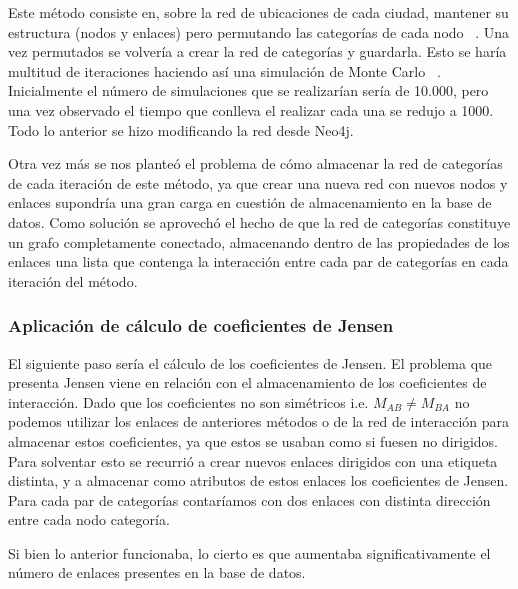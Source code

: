 Este método consiste en, sobre la red de ubicaciones de cada ciudad, mantener su estructura (nodos y enlaces) pero permutando las categorías de cada nodo ~\cite{Ahedo2021,RSVAJSSHJG}. Una vez permutados se volvería a crear la red de categorías y guardarla. Esto se haría multitud de iteraciones haciendo así una simulación de Monte Carlo ~\cite{Montecarlo}. Inicialmente el número de simulaciones que se realizarían sería de 10.000, pero una vez observado el tiempo que conlleva el realizar cada una se redujo a 1000. Todo lo anterior se hizo modificando la red desde Neo4j.

Otra vez más se nos planteó el problema de cómo almacenar la red de categorías de cada iteración de este método, ya que crear una nueva red con nuevos nodos y enlaces supondría una gran carga en cuestión de almacenamiento en la base de datos. Como solución se aprovechó el hecho de que la red de categorías constituye un grafo completamente conectado, almacenando dentro de las propiedades de los enlaces una lista que contenga la interacción entre cada par de categorías en cada iteración del método.



\subsubsection{Aplicación de cálculo de coeficientes de Jensen}

El siguiente paso sería el cálculo de los coeficientes de Jensen. El problema que presenta Jensen viene en relación con el almacenamiento de los coeficientes de interacción. Dado que los coeficientes no son simétricos i.e. $M_{AB}\neq M_{BA}$ no podemos utilizar los enlaces de anteriores métodos o de la red de interacción para almacenar estos coeficientes, ya que estos se usaban como si fuesen no dirigidos. Para solventar esto se recurrió a crear nuevos enlaces dirigidos con una etiqueta distinta, y a almacenar como atributos de estos enlaces los coeficientes de Jensen. Para cada par de categorías contaríamos con dos enlaces con distinta dirección entre cada nodo categoría.

Si bien lo anterior funcionaba, lo cierto es que aumentaba significativamente el número de enlaces presentes en la base de datos.


